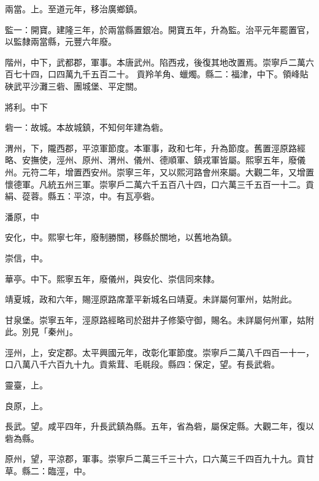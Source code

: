 \begin{pinyinscope}
 兩當。上。至道元年，移治廣鄉鎮。



 監一：開寶。建隆三年，於兩當縣置銀冶。開寶五年，升為監。治平元年罷置官，以監隸兩當縣，元豐六年廢。



 階州，中下，武都郡，軍事。本唐武州。陷西戎，後復其地改置焉。崇寧戶二萬六百七十四，口四萬九千五百二十。
 貢羚羊角、蠟燭。縣二：福津，中下。領峰貼硤武平沙灘三砦、團城堡、平定關。



 將利。中下



 砦一：故城。本故城鎮，不知何年建為砦。



 渭州，下，隴西郡，平涼軍節度。本軍事，政和七年，升為節度。舊置涇原路經略、安撫使，涇州、原州、渭州、儀州、德順軍、鎮戎軍皆屬。熙寧五年，廢儀州。元符二年，增置西安州。崇寧三年，又以熙河路會州來屬。大觀二年，又增置懷德軍。凡統五州三軍。崇寧戶二萬六千五百八十四，口六萬三千五百一十二。貢絹、蓯蓉。縣五：平涼，中。有瓦亭砦。



 潘原，中



 安化，中。熙寧七年，廢制勝關，移縣於關地，以舊地為鎮。



 崇信，中。



 華亭。中下。熙寧五年，廢儀州，與安化、崇信同來隸。



 靖夏城，政和六年，賜涇原路席葦平新城名曰靖夏。未詳屬何軍州，姑附此。



 甘泉堡。崇寧五年，涇原路經略司於甜井子修築守御，賜名。未詳屬何州軍，姑附此。別見「秦州」。



 涇州，上，安定郡。太平興國元年，改彰化軍節度。崇寧戶二萬八千四百一十一，口八萬八千六百九十九。貢紫茸、毛毼段。縣四：保定，望。有長武砦。



 靈臺，上。



 良原，上。



 長武。望。咸平四年，升長武鎮為縣。五年，省為砦，屬保定縣。大觀二年，復以砦為縣。



 原州，望，平涼郡，軍事。崇寧戶二萬三千三十六，口六萬三千四百九十九。貢甘草。縣二：臨涇，中。




\end{pinyinscope}
